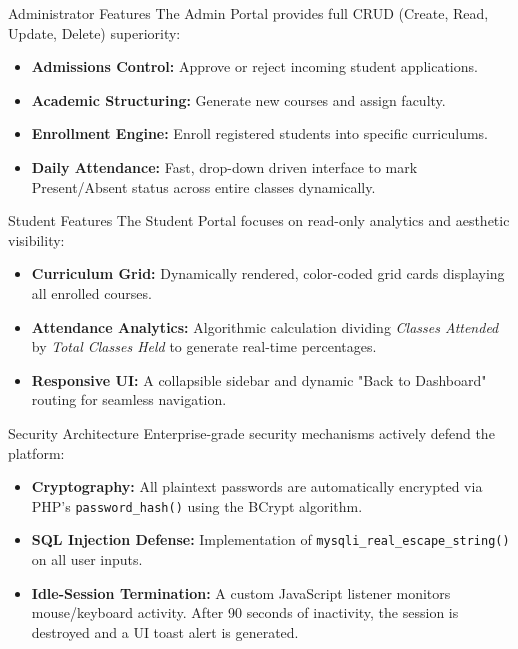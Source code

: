 \documentclass[11pt, aspectratio=169]{beamer}
\begin{document}
\begin{frame}{Administrator Features}
    The Admin Portal provides full CRUD (Create, Read, Update, Delete) superiority:
    \vspace{0.3cm}
    \begin{itemize}
        \item \textbf{Admissions Control:} Approve or reject incoming student applications.
        \item \textbf{Academic Structuring:} Generate new courses and assign faculty.
        \item \textbf{Enrollment Engine:} Enroll registered students into specific curriculums.
        \item \textbf{Daily Attendance:} Fast, drop-down driven interface to mark Present/Absent status across entire classes dynamically.
    \end{itemize}
\end{frame}

\begin{frame}{Student Features}
    The Student Portal focuses on read-only analytics and aesthetic visibility:
    \vspace{0.3cm}
    \begin{itemize}
        \item \textbf{Curriculum Grid:} Dynamically rendered, color-coded grid cards displaying all enrolled courses.
        \item \textbf{Attendance Analytics:} Algorithmic calculation dividing \textit{Classes Attended} by \textit{Total Classes Held} to generate real-time percentages.
        \item \textbf{Responsive UI:} A collapsible sidebar and dynamic "Back to Dashboard" routing for seamless navigation.
    \end{itemize}
\end{frame}

\begin{frame}{Security Architecture}
    Enterprise-grade security mechanisms actively defend the platform:
    \vspace{0.3cm}
    \begin{itemize}
        \item \textbf{Cryptography:} All plaintext passwords are automatically encrypted via PHP's \texttt{password\_hash()} using the BCrypt algorithm.
        \item \textbf{SQL Injection Defense:} Implementation of \texttt{mysqli\_real\_escape\_string()} on all user inputs.
        \item \textbf{Idle-Session Termination:} A custom JavaScript listener monitors mouse/keyboard activity. After 90 seconds of inactivity, the session is destroyed and a UI toast alert is generated.
    \end{itemize}
\end{frame}
\end{document}
